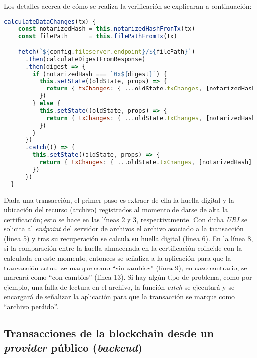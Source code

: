 Los detalles acerca de cómo se realiza la verificación se explicaran a continuación:

\begin{minipage}{\linewidth}
\begin{lstlisting}[frame=single, belowskip=1em, aboveskip=2em,  language=javascript, captionpos=b, caption=Verificación de la huella digital en las transacciones, label={lst:verificacion_huella_transaccion}]
  calculateDataChanges(tx) {
    const notarizedHash = this.notarizedHashFromTx(tx)
    const filePath      = this.filePathFromTx(tx)

    fetch(`${config.fileserver.endpoint}/${filePath}`)
      .then(calculateDigestFromResponse)
      .then(digest => {
        if (notarizedHash === `0x${digest}`) {
          this.setState((oldState, props) => {
            return { txChanges: { ...oldState.txChanges, [notarizedHash]: 'unchanged' } }
          })
        } else {
          this.setState((oldState, props) => {
            return { txChanges: { ...oldState.txChanges, [notarizedHash]: 'changed' } }
          })
        }
      })
      .catch(() => {
        this.setState((oldState, props) => {
          return { txChanges: { ...oldState.txChanges, [notarizedHash]: 'notfound' } }
        })
      })
  }
\end{lstlisting}
\end{minipage}

Dada una transacción, el primer paso es extraer de ella la huella digital y la ubicación del recurso (archivo) registrados al momento de darse de alta la certificación; esto se hace en las líneas 2 y 3, respectivamente. Con dicha \textit{URI} se solicita al \textit{endpoint} del servidor de archivos el archivo asociado a la transacción (línea 5) y tras su recuperación se calcula su huella digital (línea 6). En la línea 8, si la comparación entre la huella almacenada en la certificación coincide con la calculada en este momento, entonces se señaliza a la aplicación para que la transacción actual se marque como ``sin cambios'' (línea 9); en caso contrario, se marcará como ``con cambios'' (línea 13). Si hay algún tipo de problema, como por ejemplo, una falla de lectura en el archivo, la función \textit{catch} se ejecutará y se encargará de señalizar la aplicación para que la transacción se marque como ``archivo perdido''.

\subsection{Transacciones de la blockchain desde un \textit{provider} público (\textit{backend})}
\label{transacciones_blockchain_provider_publico}

